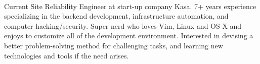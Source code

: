 \documentclass[11pt, a4paper, UTF8]{awesome-cv}
\begin{document}
\makecvheader[R]

\makecvfooter
  {\ }
  {\ }
  {\thepage}




\begin{cvparagraph}
Current Site Reliability Engineer at start-up company Kasa. 7+ years experience specializing in the backend development, infrastructure automation, and computer hacking/security. Super nerd who loves Vim, Linux and OS X and enjoys to customize all of the development environment. Interested in devising a better problem-solving method for challenging tasks, and learning new technologies and tools if the need arises.
\end{cvparagraph}
\end{document}
